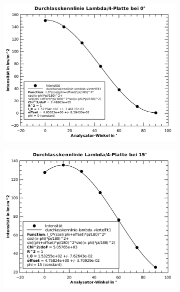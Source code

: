 \begin{figure}[H]
    \centering
    \begin{subfigure}{.45\linewidth}
        \includegraphics[width=\linewidth]{images/aufgabe-5_0grad.pdf}
    \end{subfigure}
    \begin{subfigure}{.45\linewidth}
        \includegraphics[width=\linewidth]{images/aufgabe-5_15grad.pdf}
    \end{subfigure}
    \begin{subfigure}{.45\linewidth}

\end{subfigure}
\end{figure}
